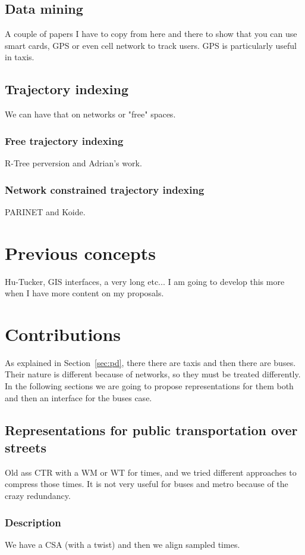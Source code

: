 \documentclass{UniVieCS_PhD} %
\begin{document}
	\subsection{Data mining}
	A couple of papers I have to copy from here and there to show that you can use smart cards, GPS or even cell network to track users. GPS is particularly useful in taxis.
	
	\subsection{Trajectory indexing}
	We can have that on networks or "free" spaces.
	
	\subsubsection{Free trajectory indexing}
	R-Tree perversion and Adrian's work.
	
	\subsubsection{Network constrained trajectory indexing}
	PARINET and Koide.
	
	\section{Previous concepts}
	Hu-Tucker, GIS interfaces, a very long etc... I am going to develop this more when I have more content on my proposals.
	
	\section{Contributions}
	As explained in Section~\ref{sec:pd}, there there are taxis and then there are buses. Their nature is different because of networks, so they must be treated differently. In the following sections we are going to propose representations for them both and then an interface for the buses case.
	
	\subsection{Representations for public transportation over streets}
	Old ass CTR with a WM or WT for times, and we tried different approaches to compress those times. It is not very useful for buses and metro because of the crazy redundancy.
	
	\subsubsection{Description}
	We have a CSA (with a twist) and then we align sampled times.
	
\end{document}
